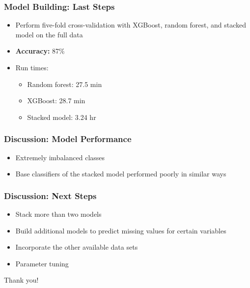 \documentclass{beamer}
\begin{document}
\begin{frame}
\frametitle{Model Building: Last Steps}
\begin{itemize}
  \item Perform five-fold cross-validation with XGBoost, random forest, and stacked model on the full data 
  \item \textbf{Accuracy:} 87\%
  \item Run times: 
  \begin{itemize}
    \item Random forest: 27.5 min
    \item XGBoost: 28.7 min
    \item Stacked model: 3.24 hr
  \end{itemize}
\end{itemize}
\end{frame}


\begin{frame}
\frametitle{Discussion: Model Performance}
\begin{itemize}
  \item Extremely imbalanced classes
  \item Base classifiers of the stacked model performed poorly in similar ways
\end{itemize}
\end{frame}


\begin{frame}
\frametitle{Discussion: Next Steps}
\begin{itemize}
  \item Stack more than two models 
  \item Build additional models to predict missing values for certain variables
  \item Incorporate the other available data sets 
  \item Parameter tuning
\end{itemize}
\end{frame}


\begin{frame}
Thank you!
\end{frame}
\end{document}
